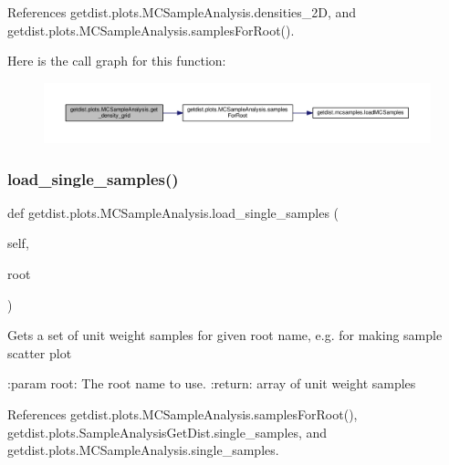 References getdist.\+plots.\+M\+C\+Sample\+Analysis.\+densities\+\_\+2D, and getdist.\+plots.\+M\+C\+Sample\+Analysis.\+samples\+For\+Root().

Here is the call graph for this function\+:
\nopagebreak
\begin{figure}[H]
\begin{center}
\leavevmode
\includegraphics[width=350pt]{classgetdist_1_1plots_1_1MCSampleAnalysis_a03533aa69a7cfeddba8e641b36b6025d_cgraph}
\end{center}
\end{figure}
\mbox{\label{classgetdist_1_1plots_1_1MCSampleAnalysis_a993420585e2d3d9625272366173756cf}} 
\subsubsection{\texorpdfstring{load\+\_\+single\+\_\+samples()}{load\_single\_samples()}}
{\footnotesize\ttfamily def getdist.\+plots.\+M\+C\+Sample\+Analysis.\+load\+\_\+single\+\_\+samples (\begin{DoxyParamCaption}\item[{}]{self,  }\item[{}]{root }\end{DoxyParamCaption})}

\begin{DoxyVerb}Gets a set of unit weight samples for given root name, e.g. for making sample scatter plot

:param root: The root name to use.
:return: array of unit weight samples
\end{DoxyVerb}
 

References getdist.\+plots.\+M\+C\+Sample\+Analysis.\+samples\+For\+Root(), getdist.\+plots.\+Sample\+Analysis\+Get\+Dist.\+single\+\_\+samples, and getdist.\+plots.\+M\+C\+Sample\+Analysis.\+single\+\_\+samples.

